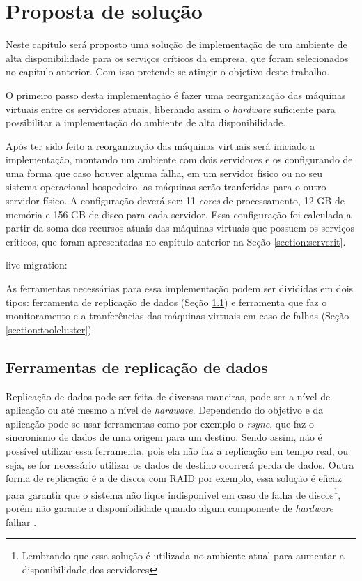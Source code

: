 \chapter{Proposta de solução}
\label{cap:propostadesolucao}

Neste capítulo será proposto uma solução de implementação de um ambiente de alta disponibilidade para os serviços críticos da empresa, que 
foram selecionados no capítulo anterior. Com isso pretende-se atingir o objetivo deste trabalho.

O primeiro passo desta implementação é fazer uma reorganização das máquinas virtuais entre os servidores atuais, liberando assim o 
\textit{hardware} suficiente para possibilitar a implementação do ambiente de alta disponibilidade. 

Após ter sido feito a reorganização das máquinas virtuais será iniciado a implementação, montando um ambiente com dois servidores e os 
configurando de uma forma que caso houver alguma falha, em um servidor físico ou no seu sistema operacional hospedeiro, as máquinas serão 
tranferidas para o outro servidor físico. 
A configuração deverá ser: 11 \textit{cores} de processamento, 12 GB de memória e 156 GB de disco para cada servidor. Essa configuração foi 
calculada a partir da soma dos recursos atuais das máquinas virtuais que possuem os serviços críticos, que foram apresentadas no capítulo
anterior na Seção \ref{section:servcrit}.

live migration:

As ferramentas necessárias para essa implementação podem ser divididas em dois tipos: ferramenta de replicação de dados 
(Seção \ref{section:toolrepl}) e ferramenta que faz o monitoramento e a tranferências das máquinas virtuais em caso de falhas 
(Seção \ref{section:toolcluster}).

\section{Ferramentas de replicação de dados}
\label{section:toolrepl}

Replicação de dados pode ser feita de diversas maneiras, pode ser a nível de aplicação ou até mesmo a nível de \textit{hardware}.
Dependendo do objetivo e da aplicação pode-se usar ferramentas como por exemplo o \textit{rsync}, que faz o sincronismo de dados de uma origem
para um destino. Sendo assim, não é possível utilizar essa ferramenta, pois ela não faz a replicação em tempo real, ou seja, se for necessário
utilizar os dados de destino ocorrerá perda de dados. Outra forma de replicação é a de discos com \ac{RAID} por exemplo, essa solução é eficaz
para garantir que o sistema não fique indisponível em caso de falha de discos\footnote{Lembrando que essa solução é utilizada no ambiente atual
para aumentar a disponibilidade dos servidores}, porém não garante a disponibilidade quando algum componente de \textit{hardware} falhar 
\cite{zaminhani2008}.


